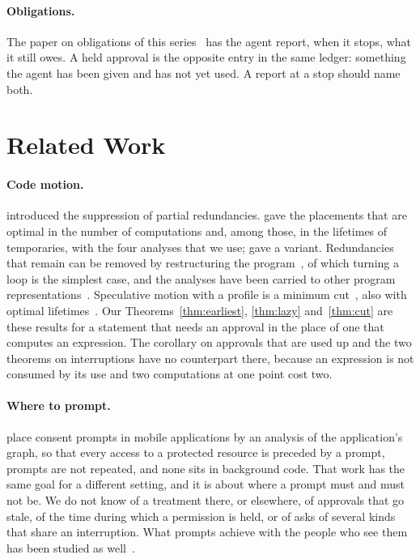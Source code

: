 \documentclass[acmsmall,nonacm,screen]{acmart}
\begin{document}
\paragraph{Obligations.} The paper on obligations of this series~\cite{tpp12} has the agent
report, when it stops, what it still owes. A held approval is the opposite entry in the
same ledger: something the agent has been given and has not yet used. A report at a stop
should name both.

\section{Related Work}
\label{sec:related}

\paragraph{Code motion.} \citet{morel1979} introduced the suppression of partial
redundancies. \citet{knoop1992,knoop1994} gave the placements that are optimal in the number
of computations and, among those, in the lifetimes of temporaries, with the four analyses
that we use; \citet{drechsler1993} gave a variant. Redundancies that remain can be
removed by restructuring the program~\cite{bodik1998}, of which turning a loop is the
simplest case, and the analyses have been carried to other program
representations~\cite{kennedy1999}. Speculative motion with a profile is a minimum
cut~\cite{cai2003}, also with optimal lifetimes~\cite{xue2006}. Our Theorems~\ref{thm:earliest},
\ref{thm:lazy} and~\ref{thm:cut} are these results for a statement that needs an approval
in the place of one that computes an expression. The corollary on approvals that are used
up and the two theorems on interruptions have no counterpart there, because an expression
is not consumed by its use and two computations at one point cost two.

\paragraph{Where to prompt.} \citet{livshits2013} place consent prompts in mobile
applications by an analysis of the application's graph, so that every access to a protected
resource is preceded by a prompt, prompts are not repeated, and none sits in background
code. That work has the same goal for a different setting, and it is about where a prompt
must and must not be. We do not know of a treatment there, or elsewhere, of approvals that
go stale, of the time during which a permission is held, or of asks of several kinds that
share an interruption. What prompts achieve with the people who see them has been studied
as well~\cite{felt2012}.
\end{document}
